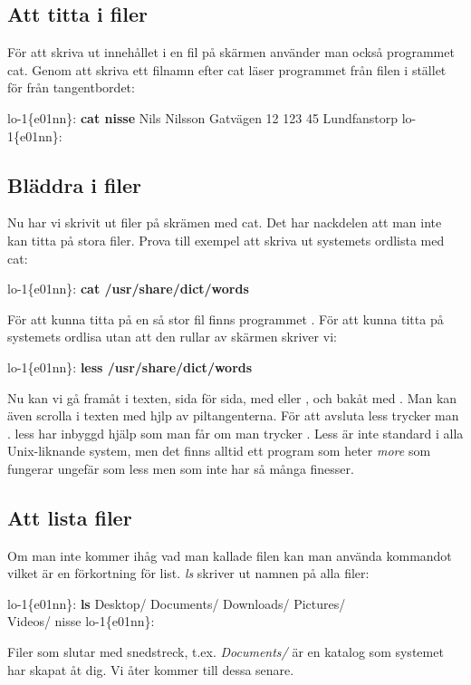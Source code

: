 \documentclass[a4paper,twocolumn]{book}
\begin{document}
\subsection{Att titta i filer}

För att skriva ut innehållet i en fil på skärmen använder man också
programmet cat. Genom att skriva ett filnamn efter cat läser
programmet från filen i stället för från tangentbordet:
\begin{example}
lo-1\{e01nn\}: \textbf{cat nisse}
Nils Nilsson
Gatvägen 12
123 45 Lundfanstorp
lo-1\{e01nn\}: 
\end{example}
\subsection{Bläddra i filer}

Nu har vi skrivit ut filer på skrämen med cat. Det har nackdelen att man
inte kan titta på stora filer. Prova till exempel att skriva ut systemets
ordlista med cat:

\begin{example}
lo-1\{e01nn\}: \textbf{cat /usr/share/dict/words}
\end{example}

För att kunna titta på en så stor fil finns programmet . För att
kunna titta på systemets ordlisa utan att den rullar av skärmen skriver vi:

\begin{example}
lo-1\{e01nn\}: \textbf{less /usr/share/dict/words}
\end{example}

Nu kan vi gå framåt i texten, sida för sida, med  eller
, och bakåt med . Man kan även scrolla i texten med hjlp av piltangenterna. För att avsluta less trycker man .
less har inbyggd hjälp som man får om man trycker .
Less är inte standard i alla Unix-liknande system, men det finns alltid ett
program som heter \emph{more} som fungerar ungefär som less men som
inte har så många finesser.

\subsection{Att lista filer}

Om man inte kommer ihåg vad man kallade filen kan man använda
kommandot  vilket är en förkortning för list. \emph{ls}
skriver ut namnen på alla filer:
\begin{example}
lo-1\{e01nn\}: \textbf{ls}
Desktop/ Documents/ Downloads/ Pictures/\\Videos/   nisse
lo-1\{e01nn\}: 
\end{example}
Filer som slutar med snedstreck, t.ex. \emph{Documents/} är en katalog som systemet har skapat åt
dig. Vi åter kommer till dessa senare.
\end{document}
